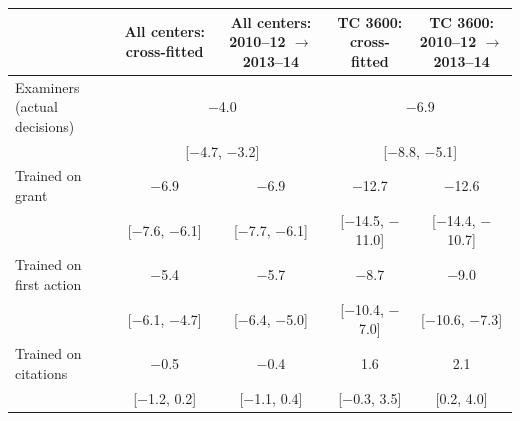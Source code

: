 \begin{tabular}{lcccc}
\toprule
 & All centers: cross-fitted & All centers: 2010--12 $\to$ 2013--14 & TC 3600: cross-fitted & TC 3600: 2010--12 $\to$ 2013--14 \\
\midrule
Examiners (actual decisions) & \multicolumn{2}{c}{$-$4.0} & \multicolumn{2}{c}{$-$6.9} \\
 & \multicolumn{2}{c}{{\footnotesize [$-$4.7, $-$3.2]}} & \multicolumn{2}{c}{{\footnotesize [$-$8.8, $-$5.1]}} \\
Trained on grant & $-$6.9 & $-$6.9 & $-$12.7 & $-$12.6 \\
 & {\footnotesize [$-$7.6, $-$6.1]} & {\footnotesize [$-$7.7, $-$6.1]} & {\footnotesize [$-$14.5, $-$11.0]} & {\footnotesize [$-$14.4, $-$10.7]} \\
Trained on first action & $-$5.4 & $-$5.7 & $-$8.7 & $-$9.0 \\
 & {\footnotesize [$-$6.1, $-$4.7]} & {\footnotesize [$-$6.4, $-$5.0]} & {\footnotesize [$-$10.4, $-$7.0]} & {\footnotesize [$-$10.6, $-$7.3]} \\
Trained on citations & $-$0.5 & $-$0.4 & 1.6 & 2.1 \\
 & {\footnotesize [$-$1.2, 0.2]} & {\footnotesize [$-$1.1, 0.4]} & {\footnotesize [$-$0.3, 3.5]} & {\footnotesize [0.2, 4.0]} \\
\bottomrule
\end{tabular}
